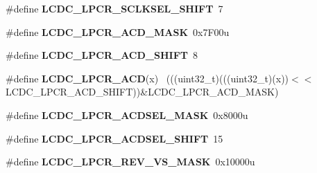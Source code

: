 \begin{DoxyCompactItemize}
\item 
\hypertarget{group___l_c_d_c___register___masks_ga819fab8d5184f4f4f6c39a50544d8150}{}\#define {\bfseries L\+C\+D\+C\+\_\+\+L\+P\+C\+R\+\_\+\+S\+C\+L\+K\+S\+E\+L\+\_\+\+S\+H\+I\+F\+T}~7\label{group___l_c_d_c___register___masks_ga819fab8d5184f4f4f6c39a50544d8150}

\item 
\hypertarget{group___l_c_d_c___register___masks_ga063e3337337f4c8fbfdaf84bf761cc45}{}\#define {\bfseries L\+C\+D\+C\+\_\+\+L\+P\+C\+R\+\_\+\+A\+C\+D\+\_\+\+M\+A\+S\+K}~0x7\+F00u\label{group___l_c_d_c___register___masks_ga063e3337337f4c8fbfdaf84bf761cc45}

\item 
\hypertarget{group___l_c_d_c___register___masks_ga6e80ca9cf5d9d191748d7ace10e067c2}{}\#define {\bfseries L\+C\+D\+C\+\_\+\+L\+P\+C\+R\+\_\+\+A\+C\+D\+\_\+\+S\+H\+I\+F\+T}~8\label{group___l_c_d_c___register___masks_ga6e80ca9cf5d9d191748d7ace10e067c2}

\item 
\hypertarget{group___l_c_d_c___register___masks_ga715597baf941a5581097216eb85dd139}{}\#define {\bfseries L\+C\+D\+C\+\_\+\+L\+P\+C\+R\+\_\+\+A\+C\+D}(x)                                              ~(((uint32\+\_\+t)(((uint32\+\_\+t)(x))$<$$<$L\+C\+D\+C\+\_\+\+L\+P\+C\+R\+\_\+\+A\+C\+D\+\_\+\+S\+H\+I\+F\+T))\&L\+C\+D\+C\+\_\+\+L\+P\+C\+R\+\_\+\+A\+C\+D\+\_\+\+M\+A\+S\+K)\label{group___l_c_d_c___register___masks_ga715597baf941a5581097216eb85dd139}

\item 
\hypertarget{group___l_c_d_c___register___masks_gaecf81d732385daa829d3c4fb026bd5f6}{}\#define {\bfseries L\+C\+D\+C\+\_\+\+L\+P\+C\+R\+\_\+\+A\+C\+D\+S\+E\+L\+\_\+\+M\+A\+S\+K}~0x8000u\label{group___l_c_d_c___register___masks_gaecf81d732385daa829d3c4fb026bd5f6}

\item 
\hypertarget{group___l_c_d_c___register___masks_ga5f5e162087ab1f4cce985717e262894d}{}\#define {\bfseries L\+C\+D\+C\+\_\+\+L\+P\+C\+R\+\_\+\+A\+C\+D\+S\+E\+L\+\_\+\+S\+H\+I\+F\+T}~15\label{group___l_c_d_c___register___masks_ga5f5e162087ab1f4cce985717e262894d}

\item 
\hypertarget{group___l_c_d_c___register___masks_ga780ae279b4adcc2aae07596443d39864}{}\#define {\bfseries L\+C\+D\+C\+\_\+\+L\+P\+C\+R\+\_\+\+R\+E\+V\+\_\+\+V\+S\+\_\+\+M\+A\+S\+K}~0x10000u\label{group___l_c_d_c___register___masks_ga780ae279b4adcc2aae07596443d39864}


\end{DoxyCompactItemize}

